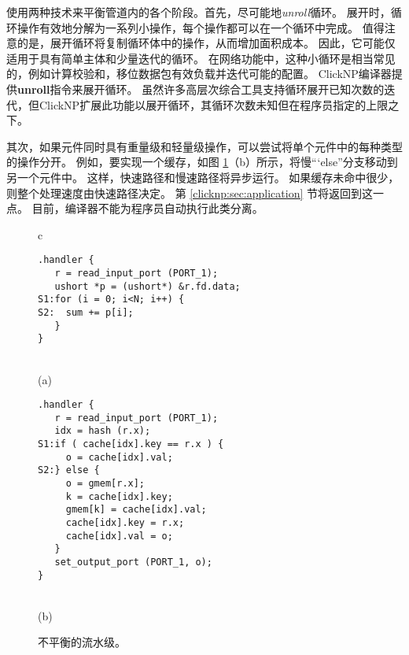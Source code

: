 \name 使用两种技术来平衡管道内的各个阶段。首先，尽可能地\textit {unroll}循环。
展开时，循环操作有效地分解为一系列小操作，每个操作都可以在一个循环中完成。
值得注意的是，展开循环将复制循环体中的操作，从而增加面积成本。
因此，它可能仅适用于具有简单主体和少量迭代的循环。
在网络功能中，这种小循环是相当常见的，例如计算校验和，移位数据包有效负载并迭代可能的配置。
ClickNP编译器提供\textbf {unroll}指令来展开循环。
虽然许多高层次综合工具支持循环展开已知次数的迭代，但ClickNP扩展此功能以展开循环，其循环次数未知但在程序员指定的上限之下。

\iffalse
\textbf{提供 pragma 让程序员指定最高循环次数}
\fi

其次，如果元件同时具有重量级和轻量级操作，可以尝试将单个元件中的每种类型的操作分开。
例如，要实现一个缓存，如图 \ref {clicknp:fig:unbalance}（b）所示，将慢“`else”分支移动到另一个元件中。
这样，快速路径和慢速路径将异步运行。
如果缓存未命中很少，则整个处理速度由快速路径决定。
第 \ref {clicknp:sec:application} 节将返回到这一点。
目前，\name 编译器不能为程序员自动执行此类分离。

\iffalse
\textbf{讨论 async}。

\textbf{更新 ClickNP 语法，端口名称}。
\fi


\begin{figure}
\lstset{style=numbers}

\centering

\begin{tabular}{c}
{
\small
\begin{lstlisting}[escapechar=@]
.handler {
   r = read_input_port (PORT_1);
   ushort *p = (ushort*) &r.fd.data;
S1:for (i = 0; i<N; i++) {
S2:  sum += p[i];
   }
}
\end{lstlisting} 
} \\
(a) \vspace{3pt} \\
{
\small 
\begin{lstlisting}[escapechar=@]
.handler {
   r = read_input_port (PORT_1);
   idx = hash (r.x);
S1:if ( cache[idx].key == r.x ) {
     o = cache[idx].val;
S2:} else {
     o = gmem[r.x];
     k = cache[idx].key;
     gmem[k] = cache[idx].val;
     cache[idx].key = r.x;
     cache[idx].val = o;
   }
   set_output_port (PORT_1, o);
}
\end{lstlisting} 
} \\
(b) \vspace{3pt} 
\end{tabular}

\caption{不平衡的流水级。}
\label{clicknp:fig:unbalance}

\end{figure}


